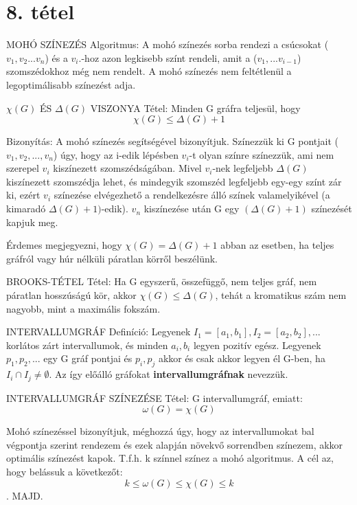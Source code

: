 \section{8. tétel}

\begin{framed}
MOHÓ SZÍNEZÉS Algoritmus: A mohó színezés sorba rendezi a csúcsokat ($v_1, v_2...v_n$) és a $v_i.$-hoz azon legkisebb színt rendeli, amit a ($v_1,...v_{i-1}$) szomszédokhoz még nem rendelt. A mohó színezés nem feltétlenül a legoptimálisabb színezést adja.
\end{framed}
\begin{framed}
$\chi(G)$ ÉS $\Delta(G)$ VISZONYA Tétel: Minden	G gráfra teljesül, hogy
$$\chi(G) \leq \Delta(G)+1$$
\end{framed}
\begin{leftbar}
Bizonyítás: A mohó színezés segítségével bizonyítjuk. Színezzük ki G pontjait ($v_1, v_2,..., v_n$) úgy, hogy az i-edik lépésben $v_i$-t olyan színre színezzük, ami nem szerepel $v_i$ kiszínezett szomszédságában. Mivel $v_i$-nek legfeljebb $\Delta(G)$ kiszínezett szomszédja lehet, és mindegyik szomszéd legfeljebb egy-egy színt zár ki, ezért $v_i$ színezése elvégezhető a rendelkezésre álló színek valamelyikével (a kimaradó $\Delta(G)+1)$-edik). $v_n$ kiszínezése után G egy $(\Delta(G)+1)$ színezését kapjuk meg.
\end{leftbar}
Érdemes megjegyezni, hogy $\chi(G) = \Delta(G)+1$ abban az esetben, ha teljes gráfról vagy húr nélküli páratlan körről beszélünk.
\begin{framed}
BROOKS-TÉTEL Tétel: Ha G egyszerű, összefüggő, nem teljes gráf, nem páratlan hosszúságú kör, akkor $\chi(G) \leq \Delta(G)$, tehát a kromatikus szám nem nagyobb, mint a maximális fokszám.
\end{framed}
\begin{shaded}
INTERVALLUMGRÁF Definíció: Legyenek $I_1 = [a_1, b_1], I_2 = [a_2, b_2],...$ korlátos zárt intervallumok, és minden $a_i, b_i$ legyen pozitív egész. Legyenek $p_1, p_2,...$ egy G gráf pontjai és ${p_i, p_j}$ akkor és csak akkor legyen él G-ben, ha $I_i\cap I_j \not= \emptyset$. Az így előálló gráfokat \textbf{intervallumgráfnak} nevezzük.
\end{shaded}
\begin{framed}
INTERVALLUMGRÁF SZÍNEZÉSE Tétel: G intervallumgráf, emiatt:
$$\omega(G) = \chi(G)$$
\end{framed}
\begin{leftbar}
Mohó színezéssel bizonyítjuk, méghozzá úgy, hogy az intervallumokat bal végpontja szerint rendezem és ezek alapján növekvő sorrendben színezem, akkor optimális színezést kapok. T.f.h. k színnel színez a mohó algoritmus. A cél az, hogy belássuk a következőt:
$$k \leq \omega(G) \leq \chi(G) \leq k$$. MAJD.
\end{leftbar}
